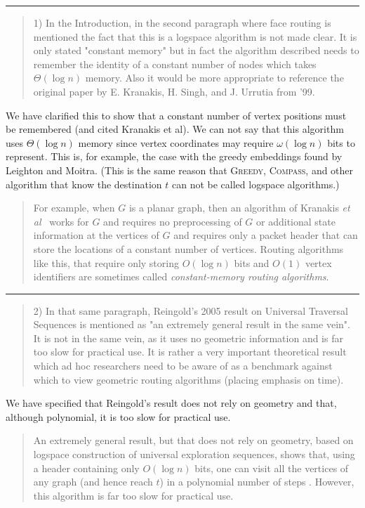 \documentclass{article}
\newcommand{\etal}{\emph{et al}}
\begin{document}
\hrule

\begin{quote}
1) In the Introduction, in the second paragraph where face routing is mentioned
the fact that this is a logspace algorithm is not made clear. It is only stated "constant memory"
but in fact the algorithm described needs to remember the identity of a constant
number of nodes which takes $\Theta(\log n)$ memory. Also it would be more
appropriate to reference the original paper by E. Kranakis, H. Singh, and J.
Urrutia from '99.
\end{quote}

We have clarified this to show that a constant number of vertex positions must be remembered (and cited Kranakis et al).  We can 
not say that this algorithm uses $\Theta(\log n)$ memory since vertex coordinates may require $\omega(\log n)$ bits to represent. This is, for example, the case with the greedy embeddings found by Leighton and Moitra.  (This is the same reason that \textsc{Greedy}, \textsc{Compass}, and other algorithm that know the destination $t$ can not be called logspace algorithms.)

\begin{quote}
For example, when $G$ is a planar graph, then an algorithm of Kranakis
\etal\ \cite{ksu99} works for $G$ and requires no preprocessing of $G$
or additional state information at the vertices of $G$ and requires only a
packet header that can store the locations of a constant number of vertices.
Routing algorithms like this, that require only storing $O(\log n)$ bits and $O(1)$ vertex identifiers are sometimes called \emph{constant-memory routing algorithms}.
\end{quote}

\hrule

\begin{quote}
2) In that same paragraph, Reingold's 2005 result on Universal Traversal Sequences is mentioned
as "an extremely general result in the same vein". It is not in the same
vein, as it uses no geometric information and is far too slow for practical
use. It is rather a very important theoretical result which ad hoc
researchers need to be aware of as a benchmark against which to view
geometric routing algorithms (placing emphasis on time).
\end{quote}

We have specified that Reingold's result does not rely on geometry and that, although polynomial, it is too slow for practical use.  

\begin{quote}
An extremely general result, but that does not rely on geometry, based on logspace construction of universal exploration sequences, shows that, using a header containing only $O(\log n)$ bits, one can visit all the vertices of any graph (and hence reach $t$) in a polynomial number of steps \cite{r05}.  However, this algorithm is far too slow for practical use.
\end{quote}
\end{document}
